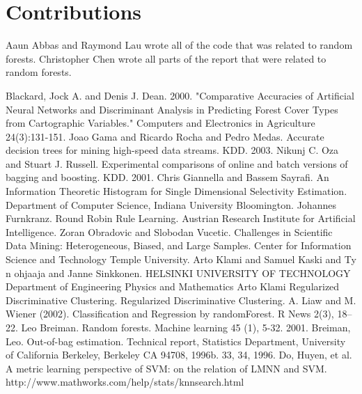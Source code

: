 \documentclass[11pt]{article}
\begin{document}
\section{Contributions}
Aaun Abbas and Raymond Lau wrote all of the code that was related to random forests. Christopher Chen wrote all parts of the report that were related to random forests.
\pagebreak
\begin{thebibliography}{}
Blackard, Jock A. and Denis J. Dean. 2000. "Comparative Accuracies of Artificial Neural Networks and Discriminant Analysis in Predicting Forest Cover Types from Cartographic Variables." Computers and Electronics in Agriculture 24(3):131-151.
Joao Gama and Ricardo Rocha and Pedro Medas. Accurate decision trees for mining high-speed data streams. KDD. 2003.
Nikunj C. Oza and Stuart J. Russell. Experimental comparisons of online and batch versions of bagging and boosting. KDD. 2001.
Chris Giannella and Bassem Sayrafi. An Information Theoretic Histogram for Single Dimensional Selectivity Estimation. Department of Computer Science, Indiana University Bloomington.
Johannes Furnkranz. Round Robin Rule Learning. Austrian Research Institute for Artificial Intelligence.
Zoran Obradovic and Slobodan Vucetic. Challenges in Scientific Data Mining: Heterogeneous, Biased, and Large Samples. Center for Information Science and Technology Temple University.
Arto Klami and Samuel Kaski and Ty n ohjaaja and Janne Sinkkonen. HELSINKI UNIVERSITY OF TECHNOLOGY Department of Engineering Physics and Mathematics Arto Klami Regularized Discriminative Clustering. Regularized Discriminative Clustering.
A. Liaw and M. Wiener (2002). Classification and Regression by randomForest. R News 2(3), 18--22.
Leo Breiman. Random forests. Machine learning 45 (1), 5-32. 2001.
Breiman, Leo. Out-of-bag estimation. Technical report, Statistics Department, University of California Berkeley, Berkeley CA 94708, 1996b. 33, 34, 1996.
Do, Huyen, et al. A metric learning perspective of SVM: on the relation of LMNN and SVM.
http://www.mathworks.com/help/stats/knnsearch.html
\end{thebibliography}
\end{document}
